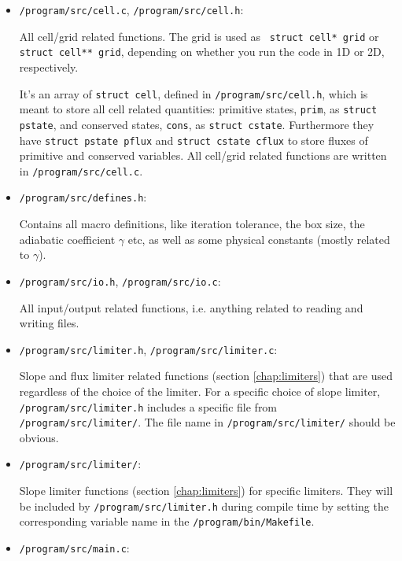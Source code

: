 \begin{itemize}
	\item 	\verb|/program/src/cell.c|, \verb|/program/src/cell.h|: 
	
			All cell/grid related functions.
			The grid is used as \verb| struct cell* grid| or \verb|struct cell** grid|, depending on whether you run the code in 1D or 2D, respectively.

			It's an array of \verb|struct cell|, defined in \verb|/program/src/cell.h|, which is meant to store all cell related quantities: primitive states, \texttt{prim}, as  \texttt{struct pstate}, and conserved states, \texttt{cons}, as \texttt{struct cstate}.
			Furthermore they have \texttt{struct pstate pflux} and \texttt{struct cstate cflux} to store fluxes of primitive and conserved variables.
			All cell/grid related functions are written in \verb|/program/src/cell.c|.	
			

	\item 	\verb|/program/src/defines.h|:
	
			Contains all macro definitions, like iteration tolerance, the box size, the adiabatic coefficient $\gamma$ etc, as well as some physical constants (mostly related to $\gamma$).
			
	\item 	\verb|/program/src/io.h|, \verb|/program/src/io.c|:
	
			All input/output related functions, i.e. anything related to reading and writing files.
			
	\item 	\verb|/program/src/limiter.h|, \verb|/program/src/limiter.c|:
	
			Slope and flux limiter related functions (section \ref{chap:limiters}) that are used regardless of the choice of the limiter.
			For a specific choice of slope limiter, \verb|/program/src/limiter.h| includes a specific file from \verb|/program/src/limiter/|.
			The file name in \verb|/program/src/limiter/| should be obvious.
			
	\item 	\verb|/program/src/limiter/|:
	
			Slope limiter functions (section \ref{chap:limiters}) for specific limiters.
			They will be included by \verb|/program/src/limiter.h| during compile time by setting the corresponding variable name in the \verb|/program/bin/Makefile|.
			
			
	\item 	\verb|/program/src/main.c|:
			

\end{itemize}
